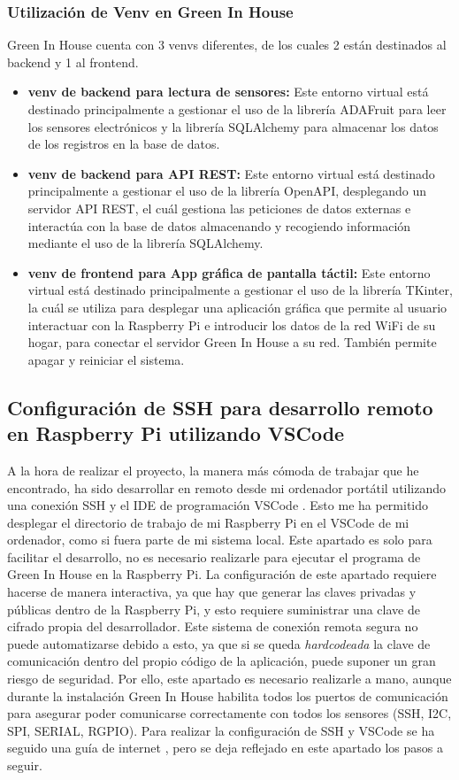         \subsubsection{Utilización de Venv en Green In House}
        Green In House cuenta con 3 venvs \cite{wiki:venv} diferentes, de los cuales 2 están destinados al backend y 1 al frontend. 
        \begin{itemize}
            \item \textbf{venv de backend para lectura de sensores:} Este entorno virtual está destinado principalmente a gestionar el uso de la librería ADAFruit para leer los sensores electrónicos y la librería SQLAlchemy para almacenar los datos de los registros en la base de datos.
            \item \textbf{venv de backend para API REST:} Este entorno virtual está destinado principalmente a gestionar el uso de la librería OpenAPI, desplegando un servidor API REST, el cuál gestiona las peticiones de datos externas e interactúa con la base de datos almacenando y recogiendo información mediante el uso de la librería SQLAlchemy.
            \item \textbf{venv de frontend para App gráfica de pantalla táctil:} Este entorno virtual está destinado principalmente a gestionar el uso de la librería TKinter, la cuál se utiliza para desplegar una aplicación gráfica que permite al usuario interactuar con la Raspberry Pi e introducir los datos de la red WiFi de su hogar, para conectar el servidor Green In House a su red. También permite apagar y reiniciar el sistema.
        \end{itemize}

    \subsection{Configuración de SSH para desarrollo remoto en Raspberry Pi utilizando VSCode}
    A la hora de realizar el proyecto, la manera más cómoda de trabajar que he encontrado, ha sido desarrollar en remoto desde mi ordenador portátil utilizando una conexión SSH \cite{wiki:ssh} y el IDE de programación VSCode \cite{wiki:vscode}. Esto me ha permitido desplegar el directorio de trabajo de mi Raspberry Pi en el VSCode de mi ordenador, como si fuera parte de mi sistema local. Este apartado es solo para facilitar el desarrollo, no es necesario realizarle para ejecutar el programa de Green In House en la Raspberry Pi. 
    La configuración de este apartado requiere hacerse de manera interactiva, ya que hay que generar las claves privadas y públicas dentro de la Raspberry Pi, y esto requiere suministrar una clave de cifrado propia del desarrollador. Este sistema de conexión remota segura no puede automatizarse debido a esto, ya que si se queda \textit{hardcodeada} la clave de comunicación dentro del propio código de la aplicación, puede suponer un gran riesgo de seguridad. Por ello, este apartado es necesario realizarle a mano, aunque durante la instalación Green In House habilita todos los puertos de comunicación para asegurar poder comunicarse correctamente con todos los sensores (SSH, I2C, SPI, SERIAL, RGPIO). Para realizar la configuración de SSH y VSCode se ha seguido una guía de internet \cite{wiki:ssh_configuracion}, pero se deja reflejado en este apartado los pasos a seguir.
